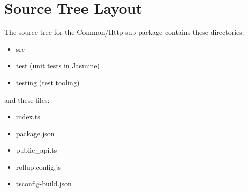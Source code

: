 \section{Source Tree Layout}

The source tree for the Common/Http sub-package contains these directories:

\begin{itemize}
  \item src
  \item test (unit tests in Jasmine)
  \item testing (test tooling)
\end{itemize}

and these files:

\begin{itemize}
  \item index.ts
  \item package.json
  \item public\_api.ts
  \item rollup.config.js
  \item tsconfig-build.json
\end{itemize}




